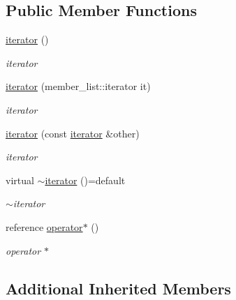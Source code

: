 \subsection*{Public Member Functions}
\begin{DoxyCompactItemize}
\item 
\hyperlink{classformat_1_1object_1_1iterator_a53abe04a3141d1ef48bd569d0d33e2c9}{iterator} ()\hypertarget{classformat_1_1object_1_1iterator_a53abe04a3141d1ef48bd569d0d33e2c9}{}\label{classformat_1_1object_1_1iterator_a53abe04a3141d1ef48bd569d0d33e2c9}

\begin{DoxyCompactList}\small\item\em iterator \end{DoxyCompactList}\item 
\hyperlink{classformat_1_1object_1_1iterator_a5ca07e90b6e39203b092f8a944ed2e3d}{iterator} (member\+\_\+list\+::iterator it)
\begin{DoxyCompactList}\small\item\em iterator \end{DoxyCompactList}\item 
\hyperlink{classformat_1_1object_1_1iterator_adb4cadbe0a6275a1e8cbe18f1241024b}{iterator} (const \hyperlink{classformat_1_1object_1_1iterator}{iterator} \&other)
\begin{DoxyCompactList}\small\item\em iterator \end{DoxyCompactList}\item 
virtual \hyperlink{classformat_1_1object_1_1iterator_a831371e9170f2789a92c7925fd33a570}{$\sim$iterator} ()=default\hypertarget{classformat_1_1object_1_1iterator_a831371e9170f2789a92c7925fd33a570}{}\label{classformat_1_1object_1_1iterator_a831371e9170f2789a92c7925fd33a570}

\begin{DoxyCompactList}\small\item\em $\sim$iterator \end{DoxyCompactList}\item 
reference \hyperlink{classformat_1_1object_1_1iterator_abb9f2a72de8c054b3b464a3b52ee0a9a}{operator$\ast$} ()
\begin{DoxyCompactList}\small\item\em operator $\ast$ \end{DoxyCompactList}\end{DoxyCompactItemize}
\subsection*{Additional Inherited Members}


